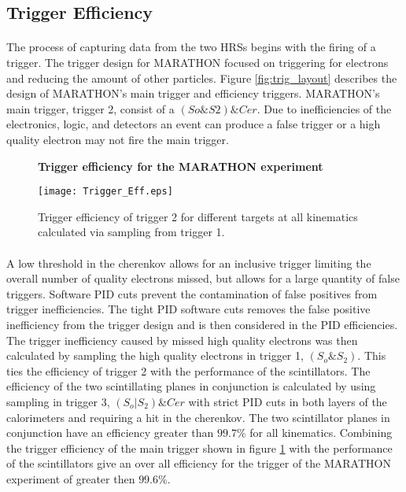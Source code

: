 \subsection{Trigger Efficiency}
\paragraph{} The process of capturing data from the two HRSs begins with the firing of a trigger. The trigger design for MARATHON focused on triggering for electrons and reducing the amount of other particles. Figure \ref{fig:trig_layout} describes the design of MARATHON's main trigger and efficiency triggers. MARATHON's main trigger, trigger 2, consist of a $(So \& S2) \& Cer$. Due to inefficiencies of the electronics, logic, and detectors an event can produce a false trigger or a high quality electron may not fire 
the main trigger.

\begin{figure}[]
	\centering
	\textbf{Trigger efficiency for the MARATHON experiment }\par\medskip
	\texttt{[image: Trigger\_Eff.eps]}
	\caption{Trigger efficiency of trigger 2 for different targets at all kinematics calculated via sampling from trigger 1. }
	\label{trigeff}
\end{figure}

\paragraph{} A low threshold in the cherenkov allows for an inclusive trigger limiting the overall number of quality electrons missed, but allows for a large quantity of false triggers. Software PID cuts prevent the contamination of false positives from trigger inefficiencies. The tight PID software cuts removes the false positive inefficiency from the trigger design and is then considered in the PID efficiencies. The trigger inefficiency caused by missed high quality electrons was then calculated by sampling the high quality electrons in trigger 1, $(S_o \& S_2)$. This ties the efficiency of trigger 2 with the performance of the scintillators. The efficiency of the two scintillating planes in conjunction is calculated by using sampling in trigger 3, $(S_o | S_2) \& Cer$ with strict PID cuts in both layers of the calorimeters and requiring a hit in the cherenkov. The two scintillator planes in conjunction have an efficiency greater than $99.7 \% $ for all kinematics. Combining the trigger efficiency of the main trigger shown in figure \ref{trigeff} with the performance of the scintillators give an over all efficiency for the trigger of the MARATHON experiment of greater then $99.6\%$.

